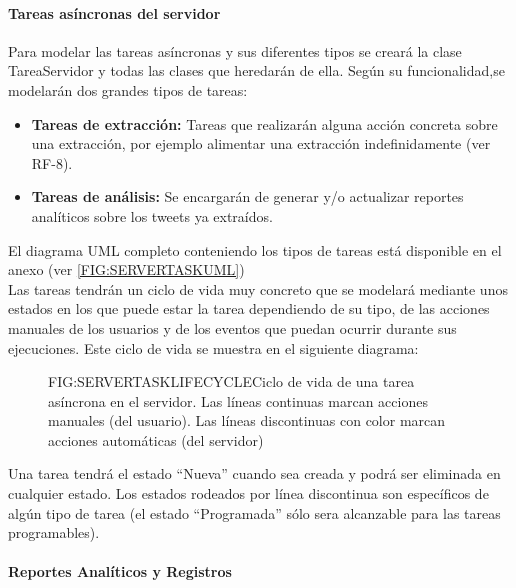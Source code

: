 \paragraph{Tareas asíncronas del servidor}
Para modelar las tareas asíncronas y sus diferentes tipos se creará la clase TareaServidor y todas las clases que heredarán de ella.
Según su funcionalidad,se modelarán dos grandes tipos de tareas:
\begin{itemize}
	\item \textbf{Tareas de extracción:} Tareas que realizarán alguna acción concreta sobre una extracción, por ejemplo alimentar una extracción indefinidamente (ver RF-8).
	\item \textbf{Tareas de análisis:} Se encargarán de generar y/o actualizar reportes analíticos sobre los tweets ya extraídos.
\end{itemize}
El diagrama UML completo conteniendo los tipos de tareas está disponible en el anexo (ver \ref{FIG:SERVERTASKUML}) \\
Las tareas tendrán un ciclo de vida muy concreto que se modelará mediante unos estados en los que puede estar la tarea dependiendo de su tipo, de las acciones manuales de los usuarios y de los eventos que puedan ocurrir durante sus ejecuciones.
Este ciclo de vida se muestra en el siguiente diagrama:

\begin{figure}[Ciclo de vida de una tarea asíncrona]{FIG:SERVERTASKLIFECYCLE}{Ciclo de vida de una tarea asíncrona en el servidor. Las líneas continuas marcan acciones manuales (del usuario). Las líneas discontinuas con color marcan acciones automáticas (del servidor)}
\end{figure}
Una tarea tendrá el estado ``Nueva'' cuando sea creada y podrá ser eliminada en cualquier estado. Los estados rodeados por línea discontinua son específicos de algún tipo de tarea (el estado ``Programada'' sólo sera alcanzable para las tareas programables).
\paragraph{Reportes Analíticos y Registros}